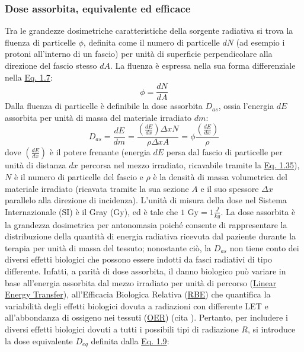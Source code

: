 \documentclass[12pt,a4paper,twoside]{report}
\begin{document}
	\subsubsection{Dose assorbita, equivalente ed efficace}
	Tra le grandezze dosimetriche caratteristiche della sorgente radiativa si trova la fluenza di particelle $\phi$, definita come il numero di particelle $dN$ (ad esempio i protoni all'interno di un fascio) per unità di superficie perpendicolare alla direzione del fascio stesso $dA$. La fluenza è espressa nella sua forma differenziale nella \hyperref[eq:fluence]{Eq. 1.7}:
	\begin{equation}
		\phi=\frac{dN}{dA}
		\label{eq:fluence}
	\end{equation}
	Dalla fluenza di particelle è definibile la dose assorbita $D_{as}$, ossia l'energia $dE$ assorbita per unità di massa del materiale irradiato $dm$:
	\begin{equation}
		D_{as}=\frac{dE}{dm}=\frac{\left(\frac{dE}{dx}\right)\Delta x N}{\rho \Delta x A}=\phi\frac{\left(\frac{dE}{dx}\right)}{\rho}
		\label{eq:dose_as}
	\end{equation}
	dove $\left(\frac{dE}{dx}\right)$ è il potere frenante (energia $dE$ persa dal fascio di particelle per unità di distanza $dx$ percorsa nel mezzo irradiato, ricavabile tramite la \hyperref[eq:bethe_bloch]{Eq. 1.35}), $N$ è il numero di particelle del fascio e $\rho$ è la densità di massa volumetrica del materiale irradiato (ricavata tramite la sua sezione $A$ e il suo spessore $\Delta x$ parallelo alla direzione di incidenza). L'unità di misura della dose nel Sistema Internazionale (SI) è il Gray (Gy), ed è tale che $1\mbox{ Gy}=1\frac{J}{kg}$. La dose assorbita è la grandezza dosimetrica per antonomasia poiché consente di rappresentare la distribuzione della quantità di energia radiativa ricevuta dal paziente durante la terapia per unità di massa del tessuto; nonostante ciò, la $D_{as}$ non tiene conto dei diversi effetti biologici che possono essere indotti da fasci radiativi di tipo differente. Infatti, a parità di dose assorbita, il danno biologico può variare in base all'energia assorbita dal mezzo irradiato per unità di percorso (\hyperref[par:let]{Linear Energy Transfer}), all'Efficacia Biologica Relativa (\hyperref[par:rbe]{RBE}) che quantifica la variabilità degli effetti biologici dovuta a radiazioni con differente LET e all'abbondanza di ossigeno nei tessuti (\hyperref[par:oer]{OER}) (cita
	). Pertanto, per includere i diversi effetti biologici dovuti a tutti i possibili tipi di radiazione $R$, si introduce la dose equivalente $D_{eq}$ definita dalla \hyperref[eq:dose_eq]{Eq. 1.9}:
\end{document}
